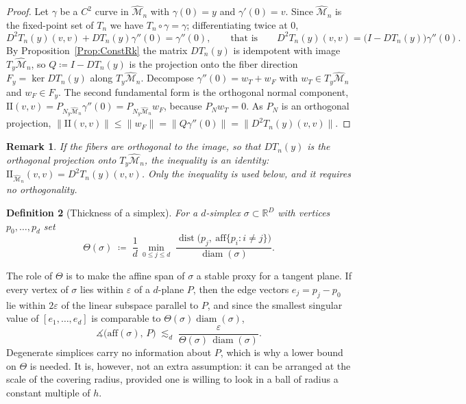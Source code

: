 \documentclass[11pt]{amsart}%
\DeclareMathOperator*{\diam}{diam}
\DeclareMathOperator*{\dist}{dist}
\theoremstyle{plain}
\newtheorem{definition}{Definition}[section]
\newtheorem{remark}[definition]{Remark}
\newcommand{\R}{{\mathbb R}}
\newcommand{\1}{\mathbf{1}}
\newcommand{\M}{\mathcal{M}}
\newcommand{\II}{\mathrm{I\!I}}   %
\newcommand{\veps}{\varepsilon}
\begin{document}
\begin{proof}
    Let $\gamma$ be a $C^2$ curve in $\widehat{\M}_n$ with $\gamma(0)=y$ and $\gamma'(0)=v$.
    Since $\widehat{\M}_n$ is the fixed-point set of $T_n$ we have $T_n\circ\gamma=\gamma$;
    differentiating twice at $0$,
    \[
        D^2T_n(y)(v,v)+DT_n(y)\gamma''(0)=\gamma''(0),
        \qquad\text{that is}\qquad
        D^2T_n(y)(v,v)=\bigl(I-DT_n(y)\bigr)\gamma''(0).
    \]
    By Proposition~\ref{Prop:ConstRk} the matrix $DT_n(y)$ is idempotent with image
    $T_y\widehat{\M}_n$, so $Q\coloneqq I-DT_n(y)$ is the projection onto the fiber direction
    $F_y=\ker DT_n(y)$ along $T_y\widehat{\M}_n$. Decompose
    $\gamma''(0)=w_T+w_F$ with $w_T\in T_y\widehat{\M}_n$ and $w_F\in F_y$. The second
    fundamental form is the orthogonal normal component,
    $\II(v,v)=P_{N_y\widehat{\M}_n}\gamma''(0)=P_{N_y\widehat{\M}_n}w_F$, because
    $P_{N}w_T=0$. As $P_N$ is an orthogonal projection,
    $\|\II(v,v)\|\le\|w_F\|=\|Q\gamma''(0)\|=\|D^2T_n(y)(v,v)\|$.
\end{proof}

\begin{remark}
    If the fibers are orthogonal to the image, so that $DT_n(y)$ is the orthogonal projection onto
    $T_y\widehat{\M}_n$, the inequality is an identity:
    $\II_{\widehat{\M}_n}(v,v)=D^2T_n(y)(v,v)$. Only the inequality is used below, and
    it requires no orthogonality.
\end{remark}

\begin{definition}[Thickness of a simplex]
    \label{Def:Thickness}
    For a $d$-simplex $\sigma\subset\R^D$ with vertices $p_0,\dots,p_d$ set
    \[
        \Theta(\sigma)\;\coloneqq\;\frac{1}{d}\,
        \min_{0\le j\le d}\;
        \frac{\dist\bigl(p_j,\ \mathrm{aff}\{p_i:i\neq j\}\bigr)}{\diam(\sigma)} .
    \]
\end{definition}

The role of $\Theta$ is to make the affine span of $\sigma$ a stable proxy for a tangent plane. If
every vertex of $\sigma$ lies within $\veps$ of a $d$-plane $P$, then the edge vectors
$e_j=p_j-p_0$ lie within $2\veps$ of the linear subspace parallel to $P$, and since the smallest singular
value of $[e_1,\dots,e_d]$ is comparable to $\Theta(\sigma)\diam(\sigma)$,
\begin{equation}\label{eqn:thickangle}
    \measuredangle\bigl(\mathrm{aff}(\sigma),\,P\bigr)\;\lesssim_d\;
    \frac{\veps}{\Theta(\sigma)\,\diam(\sigma)} .
\end{equation}
Degenerate simplices carry no information about $P$, which is why a lower bound on $\Theta$ is
needed. It is, however, not an extra assumption: it can be arranged at the scale of the covering
radius, provided one is willing to look in a ball of radius a constant multiple of $h$.
\end{document}
